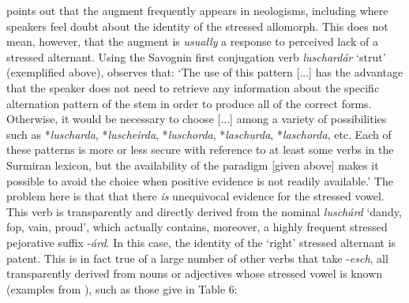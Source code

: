 \documentclass[output=paper,
modfonts
]{LSP/langsci}
\begin{document}
\citet[22]{anderson2011a} points out that the augment frequently appears in
neologisms, including where speakers feel doubt about the identity of
the stressed allomorph. This does not mean, however, that the augment is
\emph{usually} a response to perceived lack of a stressed alternant.
Using the Savognin first conjugation verb \emph{luschardár} `strut'
(exemplified above), \citet[122]{anderson2008a} observes that: `The use of this
pattern {[}...{]} has the advantage that the speaker does not need to
retrieve any information about the specific alternation pattern of the
stem in order to produce all of the correct forms. Otherwise, it would
be necessary to choose {[}...{]} among a variety of possibilities such
as *\emph{luscharda}, *\emph{luscheirda}, *\emph{luschorda},
*\emph{laschurda}, *\emph{laschorda}, etc. Each of these patterns is
more or less secure with reference to at least some verbs in the
Surmiran lexicon, but the availability of the paradigm {[}given above{]}
makes it possible to avoid the choice when positive evidence is not
readily available.' The problem here is that that there \emph{is}
unequivocal evidence for the stressed vowel. This verb is transparently
and directly derived from the nominal \emph{luschárd} `dandy, fop, vain,
proud', which actually contains, moreover, a highly frequent stressed
pejorative suffix -\emph{árd}. In this case, the identity of the `right'
stressed alternant is patent. This is in fact true of a large number of
other verbs that take -\emph{esch}, all transparently derived from nouns
or adjectives whose stressed vowel is known (examples from \citealt{signorell2001a}), such as those give in Table 6:
\end{document}
